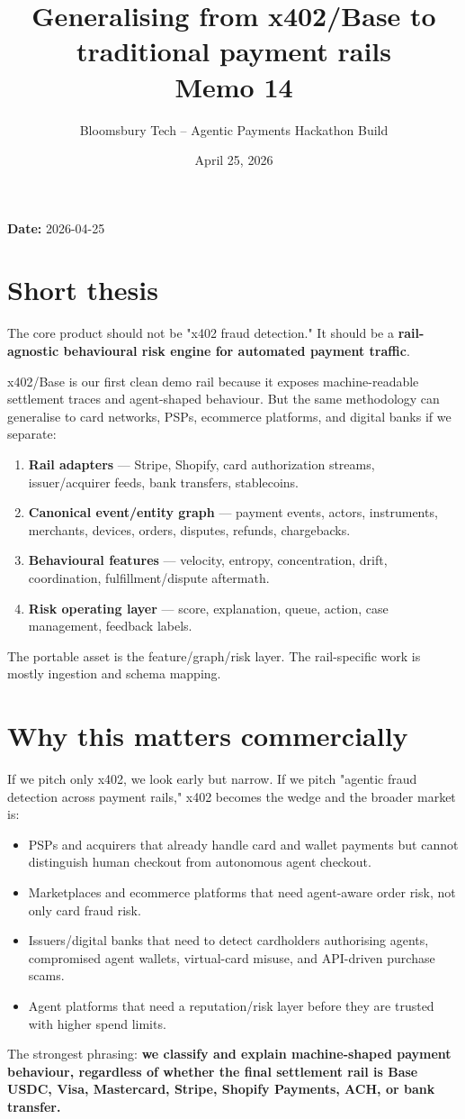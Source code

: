 \documentclass[11pt]{article}
\title{\textbf{Generalising from x402/Base to traditional payment rails}\\
\large Memo 14}
\author{Bloomsbury Tech -- Agentic Payments Hackathon Build}
\date{April 25, 2026}
\begin{document}
\maketitle

\textbf{Date:} 2026-04-25

\section{Short thesis}
The core product should not be "x402 fraud detection." It should be a \textbf{rail-agnostic behavioural risk engine for automated payment traffic}.

x402/Base is our first clean demo rail because it exposes machine-readable settlement traces and agent-shaped behaviour. But the same methodology can generalise to card networks, PSPs, ecommerce platforms, and digital banks if we separate:

\begin{enumerate}
  \item \textbf{Rail adapters} --- Stripe, Shopify, card authorization streams, issuer/acquirer feeds, bank transfers, stablecoins.
  \item \textbf{Canonical event/entity graph} --- payment events, actors, instruments, merchants, devices, orders, disputes, refunds, chargebacks.
  \item \textbf{Behavioural features} --- velocity, entropy, concentration, drift, coordination, fulfillment/dispute aftermath.
  \item \textbf{Risk operating layer} --- score, explanation, queue, action, case management, feedback labels.
\end{enumerate}
The portable asset is the feature/graph/risk layer. The rail-specific work is mostly ingestion and schema mapping.

\section{Why this matters commercially}
If we pitch only x402, we look early but narrow. If we pitch "agentic fraud detection across payment rails," x402 becomes the wedge and the broader market is:

\begin{itemize}
  \item PSPs and acquirers that already handle card and wallet payments but cannot distinguish human checkout from autonomous agent checkout.
  \item Marketplaces and ecommerce platforms that need agent-aware order risk, not only card fraud risk.
  \item Issuers/digital banks that need to detect cardholders authorising agents, compromised agent wallets, virtual-card misuse, and API-driven purchase scams.
  \item Agent platforms that need a reputation/risk layer before they are trusted with higher spend limits.
\end{itemize}
The strongest phrasing: \textbf{we classify and explain machine-shaped payment behaviour, regardless of whether the final settlement rail is Base USDC, Visa, Mastercard, Stripe, Shopify Payments, ACH, or bank transfer.}
\end{document}
